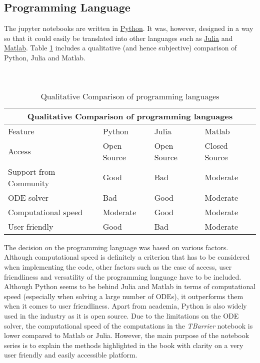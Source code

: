 \documentclass{article}
\begin{document}
\subsection{Programming Language}
The jupyter notebooks are written in \href{https://www.python.org}{Python}. It was, however, designed in a way so that it could easily be translated into other languages such as \href{https://julialang.org}{Julia} and \href{https://www.mathworks.com/products/matlab.html}{Matlab}. Table \ref{tab: language} includes a qualitative (and hence subjective) comparison of Python, Julia and Matlab.
\\ \\ \\
\begin{table}
\centering
\begin{tabular}{ |p{3cm}||p{2cm}|p{2cm}|p{2cm}|  }
 \hline
 \multicolumn{4}{|c|}{Qualitative Comparison of programming languages} \\
 \hline
Feature & Python  & Julia & Matlab \\
 \hline
Access   &  \cellcolor{green!25} Open Source    & \cellcolor{green!25} Open Source &   \cellcolor{red!25} Closed Source\\
 \hline
Support from Community &  \cellcolor{green!25} Good  & \cellcolor{red!25} Bad &   \cellcolor{yellow!25} Moderate \\
 \hline
ODE solver &  \cellcolor{red!25} Bad  & \cellcolor{green!25} Good &   \cellcolor{yellow!25} Moderate \\
 \hline
 Computational speed &  \cellcolor{yellow!25} Moderate  & \cellcolor{green!25} Good &   \cellcolor{yellow!25} Moderate \\
 \hline
  User friendly &  \cellcolor{green!25} Good  & \cellcolor{red!25} Bad &   \cellcolor{yellow!25} Moderate \\
 \hline
\end{tabular}
\caption{Qualitative Comparison of programming languages}
\label{tab: language}
\end{table}
The decision on the programming language was based on various factors. Although computational speed is definitely a criterion that has to be considered when implementing the code, other factors such as the ease of access, user friendliness and versatility of the programming language have to be included. Although Python seems to be behind Julia  and Matlab in terms of computational speed (especially when solving a large number of ODEs), it outperforms them when it comes to user friendliness. Apart from academia, Python is also widely used in the industry as it is open source. Due to the limitations on the ODE solver, the computational speed of the computations in the \textit{TBarrier} notebook is lower compared to Matlab or Julia. However, the main purpose of the notebook series is to explain the methods highlighted in the book with clarity on a very user friendly and easily accessible platform.
\end{document}

